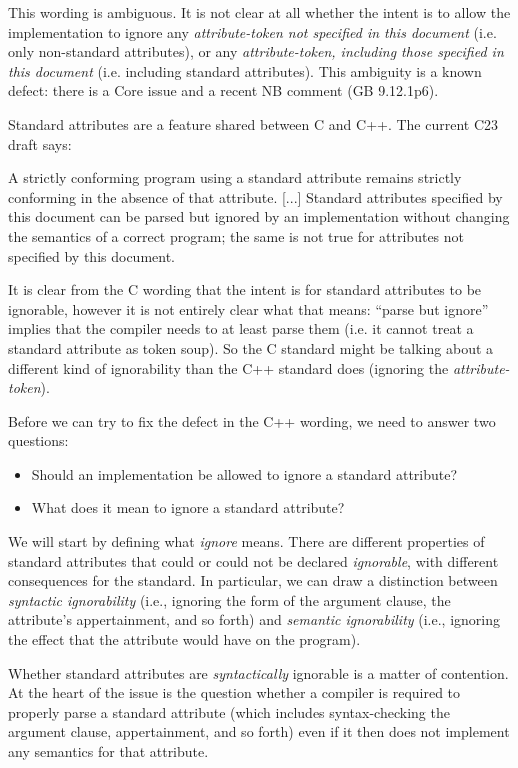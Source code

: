 This wording is ambiguous. It is not clear at all whether the intent is to allow the implementation to ignore any  \emph{attribute-token not specified in this document} (i.e. only non-standard attributes), or any  \emph{attribute-token, including those specified in this document} (i.e. including standard attributes). This ambiguity is a known defect: there is a Core issue \cite{CWG2538} and a recent NB comment (GB 9.12.1p6).

Standard attributes are a feature shared between C and C++. The current C23 draft says:

\begin{adjustwidth}{0.5cm}{0.5cm}
A strictly conforming program using a standard attribute remains
strictly conforming in the absence of that attribute. [...] Standard attributes specified by this document can be parsed but ignored by an implementation without changing the semantics of a correct program; the same is not true for attributes not specified by this document.
\end{adjustwidth}

It is clear from the C wording that the intent is for standard attributes to be ignorable, however it is not entirely clear what that means: ``parse but ignore'' implies that the compiler needs to at least parse them (i.e. it cannot treat a standard attribute as token soup). So the C standard might be talking about a different kind of ignorability than the C++ standard does (ignoring the \emph{attribute-token}).

Before we can try to fix the defect in the C++ wording, we need to answer two questions:

\begin{itemize}
\item Should an implementation be allowed to ignore a standard attribute?
\item What does it mean to ignore a standard attribute?
\end{itemize}

We will start by defining what \emph{ignore} means. There are different properties of standard attributes that could or could not be declared \emph{ignorable}, with different consequences for the standard. In particular, we can draw a distinction between \emph{syntactic ignorability} (i.e., ignoring the form of the argument clause, the attribute's appertainment, and so forth) and \emph{semantic ignorability} (i.e., ignoring the effect that the attribute would have on the program).

Whether standard attributes are \emph{syntactically} ignorable is a matter of contention. At the heart of the issue is the question whether a compiler is required to properly parse a standard attribute (which includes syntax-checking the argument clause, appertainment, and so forth) even if it then does not implement any semantics for that attribute.

